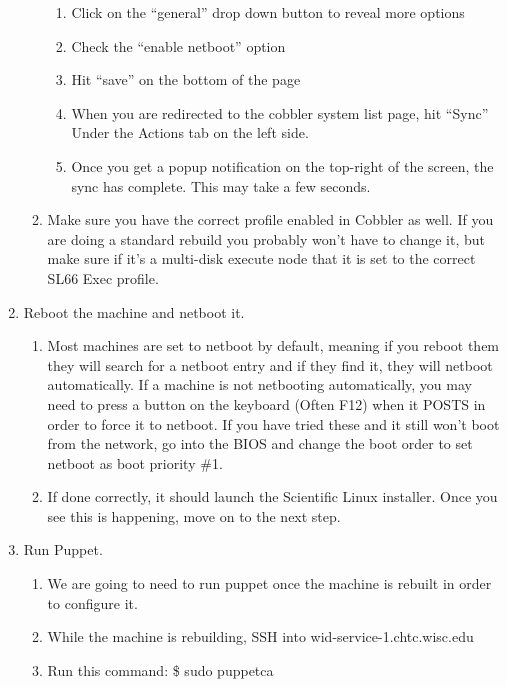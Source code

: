 \documentclass[10pt,letterpaper]{article}
\begin{document}
\begin{enumerate}
\begin{enumerate}
\begin{enumerate}
                \item Click on the “general” drop down button to reveal more options
                \item Check the “enable netboot” option
                \item Hit “save” on the bottom of the page
                \item When you are redirected to the cobbler system list page,
                hit “Sync” Under the Actions tab on the left side.
                \item Once you get a popup notification on the top-right of the
                screen, the sync has complete. This may take a few seconds.
            \end{enumerate}
            \item Make sure you have the correct profile enabled in Cobbler as
            well. If you are doing a standard rebuild you probably won’t have to
            change it, but make sure if it’s a multi-disk execute node that it is
            set to the correct SL66 Exec profile.
        \end{enumerate}
        \item Reboot the machine and netboot it.
        \begin{enumerate}
            \item Most machines are set to netboot by default, meaning if you
            reboot them they will search for a netboot entry and if they find it,
            they will netboot automatically. If a machine is not netbooting automatically,
            you may need to press a button on the keyboard (Often F12) when it POSTS
            in order to force it to netboot. If you have tried these and it still
            won’t boot from the network, go into the BIOS and change the boot order
            to set netboot as boot priority \#1.
            \item If done correctly, it should launch the Scientific Linux installer.
            Once you see this is happening, move on to the next step.
        \end{enumerate}
        \item Run Puppet.
        \begin{enumerate}
            \item We are going to need to run puppet once the machine is rebuilt
            in order to configure it.
            \item While the machine is rebuilding, SSH into wid-service-1.chtc.wisc.edu
            \item Run this command: {\selectfont \$ sudo puppetca
}
\end{enumerate}
\end{enumerate}
\end{document}
